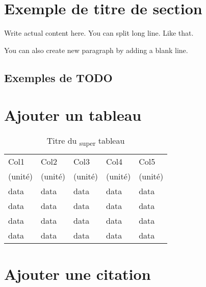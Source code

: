 \section{Exemple de titre de section}

Write actual content here.
You can split long line.
Like that.

You can also create new paragraph by adding a blank line.

\subsection{Exemples de TODO}


\section{Ajouter un tableau}

\begin{table}[h!]
    \centering
    \caption{Titre du \textsubscript{super} tableau}
    \begin{tabular}{lllll}
        \hline
        Col1    & Col2    & Col3    & Col4    & Col5\\
        (unité) & (unité) & (unité) & (unité) & (unité)\\
        \hline\hline
        data & data & data & data & data\\
        data & data & data & data & data\\
        data & data & data & data & data\\
        data & data & data & data & data\\
        \hline
    \end{tabular}
    \label{tab:template-Vout}
\end{table}

\section{Ajouter une citation}

